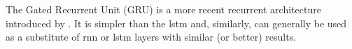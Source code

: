 

The Gated Recurrent Unit (GRU) is a more recent recurrent
architecture introduced by \textcite{cho2014learning}. It is
simpler than the \gls{lstm} and, similarly, can generally be used
as a substitute of \gls{rnn} or \gls{lstm} layers with similar (or
better) results.
